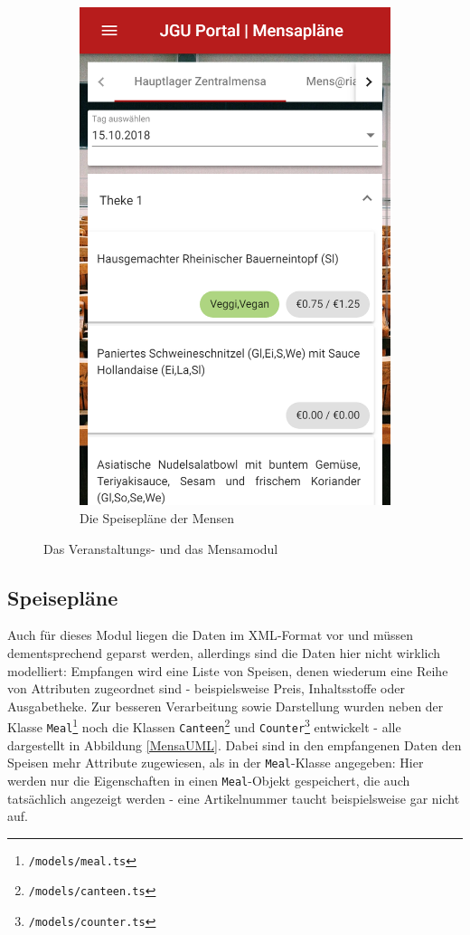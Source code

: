 \begin{figure}
\begin{subfigure}{.5\textwidth}
  \includegraphics[width=.8\linewidth]{gfx/Mensa}
  \caption{Die Speisepläne der Mensen}
  \label{fig:canteens}
\end{subfigure}
\caption{Das Veranstaltungs- und das Mensamodul}
\label{fig:events+canteens}
\end{figure}
\subsection{Speisepläne}
\label{sec:prog:canteens}
Auch für dieses Modul liegen die Daten im \acs{XML}-Format vor und müssen dementsprechend geparst werden, allerdings sind die Daten hier nicht wirklich modelliert: Empfangen wird eine Liste von Speisen, denen wiederum eine Reihe von Attributen zugeordnet sind - beispielsweise Preis, Inhaltsstoffe oder Ausgabetheke. Zur besseren Verarbeitung sowie Darstellung wurden neben der Klasse \texttt{Meal}\footnote{\texttt{/models/meal.ts}} noch die Klassen \texttt{Canteen}\footnote{\texttt{/models/canteen.ts}} und \texttt{Counter}\footnote{\texttt{/models/counter.ts}} entwickelt - alle dargestellt in Abbildung \ref{MensaUML}. Dabei sind in den empfangenen Daten den Speisen mehr Attribute zugewiesen, als in der \texttt{Meal}-Klasse angegeben: Hier werden nur die Eigenschaften in einen \texttt{Meal}-Objekt gespeichert, die auch tatsächlich angezeigt werden - eine Artikelnummer taucht beispielsweise gar nicht auf.

